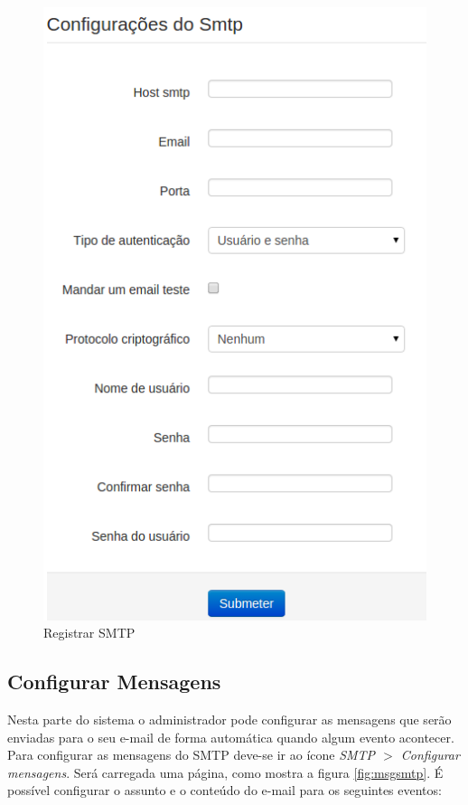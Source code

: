 \begin{figure}[ht]
     \centering
     \includegraphics[scale=0.6]{images/smtp.png}
     \caption{Registrar SMTP}
     \label{fig:smtp}
\end{figure}

\subsection{Configurar Mensagens}

Nesta parte do sistema o administrador pode configurar as mensagens que serão enviadas para o seu e-mail de forma automática quando algum evento acontecer. Para configurar as mensagens do SMTP deve-se ir ao ícone \textit{SMTP $>$ Configurar mensagens}. Será carregada uma página, como mostra a figura \ref{fig:msgsmtp}. É possível configurar o assunto e o conteúdo do e-mail para os seguintes eventos:


